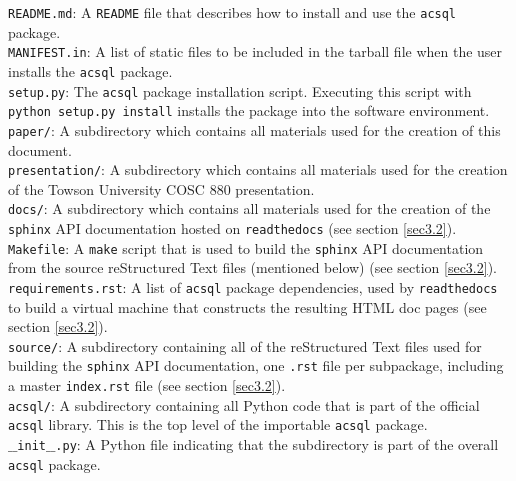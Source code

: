 \documentclass[10pt,journal,compsoc]{IEEEtran}
\begin{document}
\noindent\texttt{README.md}: A \texttt{README} file that describes how to install and use the \texttt{acsql} package.\\

\noindent\texttt{MANIFEST.in}: A list of static files to be included in the tarball file when the user installs the \texttt{acsql} package.\\

\noindent\texttt{setup.py}: The \texttt{acsql} package installation script.  Executing this script with \texttt{python setup.py install} installs the package into the software environment.\\

\noindent\texttt{paper/}: A subdirectory which contains all materials used for the creation of this document.\\

\noindent\texttt{presentation/}: A subdirectory which contains all materials used for the creation of the Towson University COSC 880 presentation.\\

\noindent\texttt{docs/}: A subdirectory which contains all materials used for the creation of the \texttt{sphinx} API documentation hosted on \texttt{readthedocs} (see section \ref{sec3.2}).\\

\noindent\texttt{Makefile}: A \texttt{make} script that is used to build the \texttt{sphinx} API documentation from the source reStructured Text files (mentioned below) (see section \ref{sec3.2}).\\

\noindent\texttt{requirements.rst}: A list of \texttt{acsql} package dependencies, used by \texttt{readthedocs} to build a virtual machine that constructs the resulting HTML doc pages
(see section \ref{sec3.2}).\\

\noindent\texttt{source/}: A subdirectory containing all of the reStructured Text files used for building the \texttt{sphinx} API documentation, one \texttt{.rst} file per subpackage, including
a master \texttt{index.rst} file (see section \ref{sec3.2}).\\

\noindent\texttt{acsql/}: A subdirectory containing all Python code that is part of the official \texttt{acsql} library. This is the top level of the importable \texttt{acsql} package.\\

\noindent\texttt{$\_$$\_$init$\_$$\_$.py}: A Python file indicating that the subdirectory is part of the overall \texttt{acsql} package.\\
\end{document}

